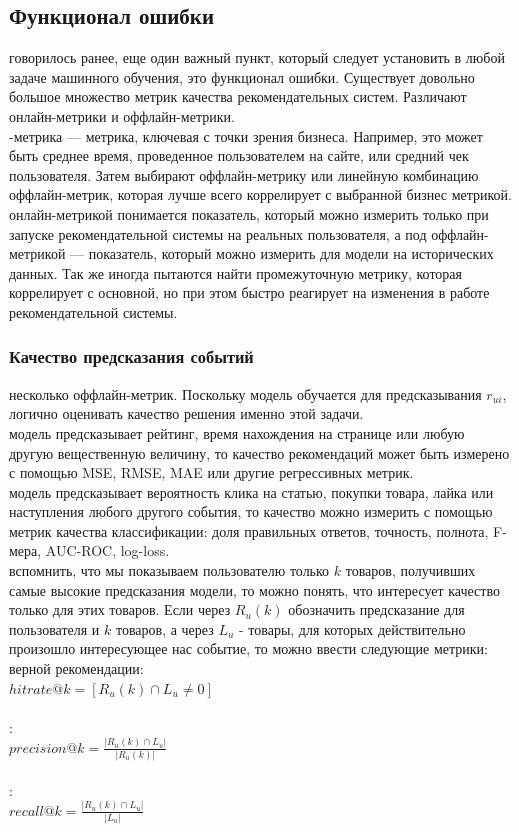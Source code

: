 \documentclass{article}
\newcommand\tab[1][1cm]{\hspace*{#1}}
\begin{document}
\subsection{Функционал ошибки}
 говорилось ранее, еще один важный пункт, который следует установить в любой задаче машинного обучения, это функционал ошибки. Существует довольно большое множество метрик качества рекомендательных систем. Различают онлайн-метрики и оффлайн-метрики.\\
-метрика — метрика, ключевая с точки зрения бизнеса. Например, это может быть среднее время, проведенное пользователем на сайте, или средний чек пользователя. Затем выбирают оффлайн-метрику или линейную комбинацию оффлайн-метрик, которая лучше всего коррелирует с выбранной бизнес метрикой.\\ 
 онлайн-метрикой понимается показатель, который можно измерить только при запуске рекомендательной системы на реальных пользователя, а под оффлайн-метрикой — показатель, который можно измерить для модели на исторических данных. Так же иногда пытаются найти промежуточную метрику, которая коррелирует с основной, но при этом быстро реагирует на изменения в работе рекомендательной системы.\\
\subsubsection{Качество предсказания событий}
 несколько оффлайн-метрик. Поскольку модель обучается для предсказывания $r_{ui}$, логично оценивать качество решения именно этой задачи.\\
 модель предсказывает рейтинг, время нахождения на странице или любую другую вещественную величину, то качество рекомендаций может быть измерено с помощью ﻿MSE﻿, ﻿RMSE, ﻿MAE﻿ или другие регрессивных метрик.\\
 модель предсказывает вероятность клика на статью, покупки товара, лайка или наступления любого другого события, то качество можно измерить с помощью метрик качества классификации: доля правильных ответов, точность, полнота, F-мера, AUC-ROC, log-loss.\\
 вспомнить, что мы показываем пользователю только ﻿$k$﻿ товаров, получивших самые высокие предсказания модели, то можно понять, что интересует качество только для этих товаров. Если через ﻿$R_u(k)$ обозначить предсказание для пользователя и ﻿$k$ товаров, а через $L_u$ - товары, для которых действительно произошло интересующее нас событие, то можно ввести следующие метрики:\\
 верной рекомендации:\\
\tab\tab$hitrate@k=[R_u(k)\cap L_u \neq 0]$\\
\\
:\\
\tab\tab$precision@k=\frac{|R_u(k)\cap L_u|}{|R_u(k)|}$\\
\\
:\\
\tab\tab$recall@k=\frac{|R_{u}(k)\cap L_{u}|}{|L_{u}|}$\\
\end{document}
